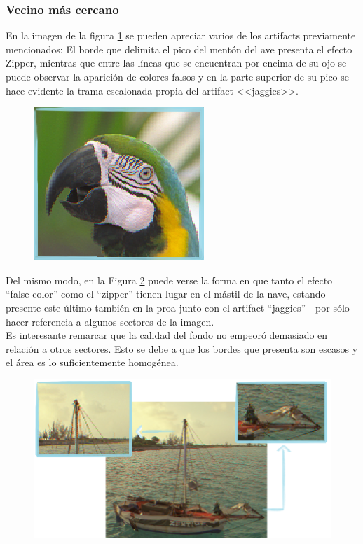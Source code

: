 \documentclass[a4paper]{article}
\begin{document}
\subsubsection{Vecino más cercano}

En la imagen de la figura \ref{lorovecino} se pueden apreciar varios de los artifacts previamente mencionados: 
El borde que delimita el pico del mentón del ave presenta el efecto Zipper, mientras que entre las líneas que se encuentran por encima de su ojo se puede observar la aparición de colores falsos y en la parte superior de su pico se hace evidente la trama escalonada propia del artifact <<jaggies>>.


\begin{figure}[h!]
	\caption{}
	\begin{center}
	\includegraphics[scale=1]{imagenes/lorovecino}
	\label{lorovecino}
  \end{center}
\end{figure}


Del mismo modo, en la Figura \ref{barcovecino}  puede verse la forma en que tanto el efecto ``false color'' como el ``zipper'' tienen lugar en el mástil de la nave, estando presente este último también en la proa junto con el artifact ``jaggies'' - por sólo hacer referencia a algunos sectores de la imagen.\\
Es interesante remarcar que la calidad del fondo no empeoró demasiado en relación  a otros sectores. Esto se debe a que los bordes que presenta son escasos y el área es lo suficientemente homogénea.

\newpage

\begin{figure}[h!]
	\caption{}
	\begin{center}
	\includegraphics[scale=0.7]{imagenes/barcovecino}
	\label{barcovecino}
  \end{center}
\end{figure}
\end{document}
